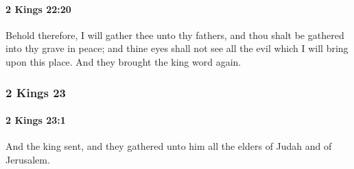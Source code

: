		\paragraph{2 Kings 22:20} %
			\label{2KINGS-22-20}

			Behold therefore, I will gather thee unto thy fathers, and thou shalt be gathered into thy grave in peace; and thine eyes shall not see all the evil which I will bring upon this place. And they brought the king word again.

	\subsubsection{2 Kings 23} %
		\label{2KINGS-23}

		\paragraph{2 Kings 23:1} %
			\label{2KINGS-23-1}

			And the king sent, and they gathered unto him all the elders of Judah and of Jerusalem.


